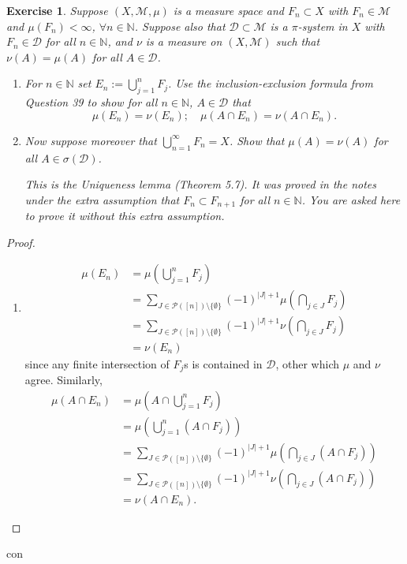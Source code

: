 \documentclass{article}
\newtheorem{exercise}[theorem]{Exercise}
\begin{document}
\begin{exercise}
Suppose \( (X, \mathcal{M}, \mu) \) is a measure space and \( F_n \subset X \) with \( F_n \in \mathcal{M} \) and \( \mu(F_n) < \infty \), \( \forall n \in \mathbb{N} \). Suppose also that \( \mathcal{D} \subset \mathcal{M} \) is a \(\pi\)-system in \( X \) with \( F_n \in \mathcal{D} \) for all \( n \in \mathbb{N} \), and \( \nu \) is a measure on \( (X, \mathcal{M}) \) such that \( \nu(A) = \mu(A) \) for all \( A \in \mathcal{D} \).
    
    \begin{enumerate}
        \item[(a)] For \( n \in \mathbb{N} \) set \( E_n := \bigcup_{j=1}^{n} F_j \). Use the inclusion-exclusion formula from Question 39 to show for all \( n \in \mathbb{N} \), \( A \in \mathcal{D} \) that
        \[
        \mu(E_n) = \nu(E_n); \quad \mu(A \cap E_n) = \nu(A \cap E_n).
        \]
        \item[(b)] Now suppose moreover that \( \bigcup_{n=1}^{\infty} F_n = X \). Show that \( \mu(A) = \nu(A) \) for all \( A \in \sigma(\mathcal{D}) \).
        
        \textit{This is the Uniqueness lemma (Theorem 5.7). It was proved in the notes under the extra assumption that \( F_n \subset F_{n+1} \) for all \( n \in \mathbb{N} \). You are asked here to prove it without this extra assumption.}
    \end{enumerate}
\end{exercise} 
\begin{proof}
\begin{enumerate}
    \item[(a)] \begin{align*}\mu(E_n)&=\mu(\bigcup_{j=1}^n F_j)\\&=\sum_{J\in\mathcal{P}([n])\setminus\{\emptyset\}}(-1)^{|J|+1}\mu(\bigcap_{j\in J}F_j)\\&=\sum_{J\in\mathcal{P}([n])\setminus\{\emptyset\}}(-1)^{|J|+1}\nu(\bigcap_{j\in J}F_j)\\&=\nu(E_n)\end{align*} since any finite intersection of $F_j$s is contained in $\mathcal{D}$, other which $\mu$ and $\nu$ agree.
    Similarly, \begin{align*}\mu(A\cap E_n)&=\mu(A\cap \bigcup_{j=1}^n F_j)\\&=\mu(\bigcup_{j=1}^n (A\cap F_j))\\&=\sum_{J\in\mathcal{P}([n])\setminus\{\emptyset\}}(-1)^{|J|+1}\mu(\bigcap_{j\in J}(A\cap F_j))\\&=\sum_{J\in\mathcal{P}([n])\setminus\{\emptyset\}}(-1)^{|J|+1}\nu(\bigcap_{j\in J}(A\cap F_j))\\&=\nu(A\cap E_n).\end{align*}
\end{enumerate}
\end{proof}con
\end{document}
